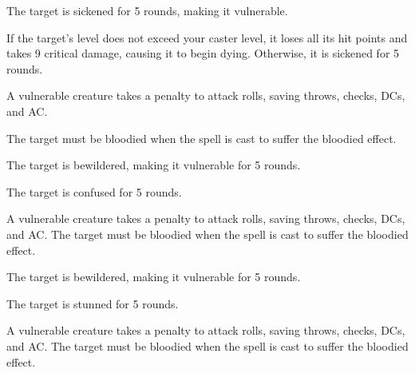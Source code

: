 \spellrng{\rngclose}
\begin{spellhealthy}
  The target is sickened for 5 rounds, making it vulnerable.
\end{spellhealthy}
\begin{spellblood}
  If the target's level does not exceed your caster level, it loses all its hit points and takes 9 critical damage, causing it to begin dying. Otherwise, it is sickened for 5 rounds.
\end{spellblood}
\begin{spellnotes}
  A vulnerable creature takes a  penalty to attack rolls, saving throws, checks, DCs, and AC.

  The target must be bloodied when the spell is cast to suffer the bloodied effect.
\end{spellnotes}

\spellrng{\rngclose}
\begin{spellhealthy}
  The target is bewildered, making it vulnerable for 5 rounds.
\end{spellhealthy}
\begin{spellblood}
  The target is confused for 5 rounds. \confusionexplanation
\end{spellblood}
\begin{spellnotes}
  A vulnerable creature takes a  penalty to attack rolls, saving throws, checks, DCs, and AC.
  The target must be bloodied when the spell is cast to suffer the bloodied effect.
\end{spellnotes}

\spellrng{\rngclose}
\begin{spellhealthy}
  The target is bewildered, making it vulnerable for 5 rounds.
\end{spellhealthy}
\begin{spellblood}
  The target is stunned for 5 rounds.
\end{spellblood}
\begin{spellnotes}
  A vulnerable creature takes a  penalty to attack rolls, saving throws, checks, DCs, and AC.
  The target must be bloodied when the spell is cast to suffer the bloodied effect.
\end{spellnotes}

